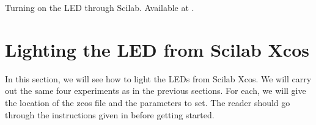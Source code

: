 \begin{scicode}
  {Turning on the LED through Scilab.  Available at
    .}
  \label{sci:led-blue}
  
\end{scicode}

\begin{scicode}
  \label{sci:led-blue-delay}
  
\end{scicode}

\begin{scicode}
  \label{sci:led-blue-red}
  
\end{scicode}

\begin{scicode}
  \label{sci:led-green-blink}
  
\end{scicode}


\section{Lighting the LED from Scilab Xcos}
\label{sec:light-xcos}
In this section, we will see how to light the LEDs from Scilab Xcos.
We will carry out the same four experiments as in the previous
sections.  For each, we will give the location
of the zcos file and the parameters to set.  The reader should go
through the instructions given in  before
getting started.


